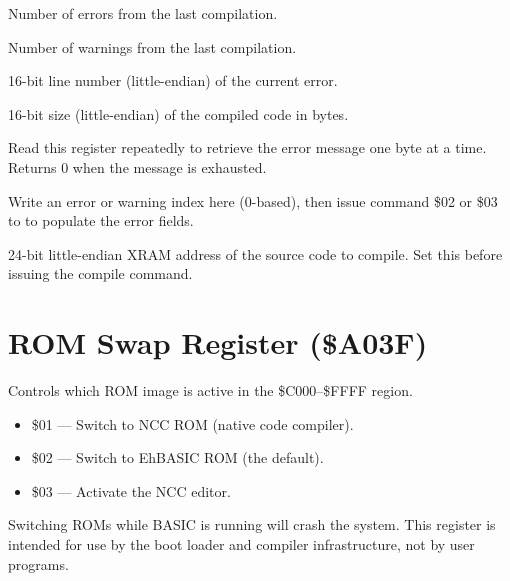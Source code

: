 
Number of errors from the last compilation.


Number of warnings from the last compilation.


16-bit line number (little-endian) of the current error.


16-bit size (little-endian) of the compiled code in bytes.


Read this register repeatedly to retrieve the error message one byte at a
time.  Returns 0 when the message is exhausted.


Write an error or warning index here (0-based), then issue command \$02 or
\$03 to  to populate the error fields.


24-bit little-endian XRAM address of the source code to compile.  Set this
before issuing the compile command.


\section{ROM Swap Register (\$A03F)}
\label{sec:vgc-romswap}


Controls which ROM image is active in the \$C000--\$FFFF region.

\begin{itemize}
  \item \$01 --- Switch to NCC ROM (native code compiler).
  \item \$02 --- Switch to EhBASIC ROM (the default).
  \item \$03 --- Activate the NCC editor.
\end{itemize}

\begin{warningbox}
Switching ROMs while BASIC is running will crash the system.  This register is
intended for use by the boot loader and compiler infrastructure, not by user
programs.
\end{warningbox}



